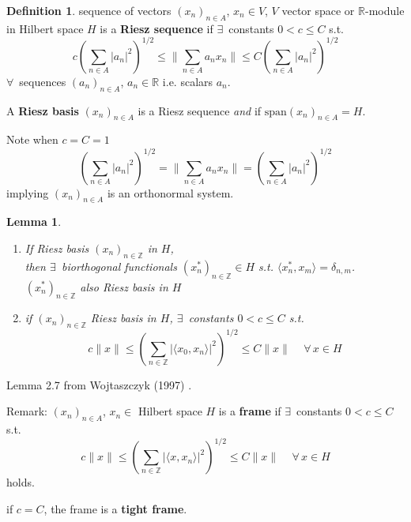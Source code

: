 \documentclass[twoside]{amsart}
\theoremstyle{plain}
\newtheorem{lemma}{Lemma}
\theoremstyle{definition}
\newtheorem{definition}{Definition}
\theoremstyle{remark}
\numberwithin{equation}{section}
\begin{document}
\begin{definition}
  sequence of vectors $(x_n)_{n\in A}$, $x_n \in V$, $V$ vector space or $\mathbb{R}$-module in Hilbert space $H$ is a \textbf{Riesz sequence} if $\exists \, $ constants $0<c\leq C$ s.t.
\begin{equation}
  c \left( \sum_{n \in A} |a_n|^2 \right)^{1/2} \leq \| \sum_{n\in A} a_n x_n \| \leq C \left( \sum_{n\in A} |a_n|^2 \right)^{1/2}
\end{equation}
$\forall \, $ sequences $(a_n)_{n\in A}$, $a_n \in \mathbb{R}$ i.e. scalars $a_n$. 
\end{definition}
A \textbf{Riesz basis } $(x_n)_{n\in A}$ is a Riesz sequence \emph{and } if $\text{span}(x_n)_{n\in A} = H$.  

Note when $c=C = 1$
\[
 \left( \sum_{n \in A} |a_n|^2 \right)^{1/2} = \| \sum_{n\in A} a_n x_n \| = \left( \sum_{n\in A} |a_n|^2 \right)^{1/2}
\]
implying $(x_n)_{n\in A}$ is an orthonormal system.  

\begin{lemma}
\begin{enumerate}
\item[(a)]
If Riesz basis $(x_n)_{n\in \mathbb{Z}}$ in $H$, \\
\phantom{If } then $\exists \, $ biorthogonal functionals $(x^*_n)_{n\in \mathbb{Z}} \in H$ s.t. $\langle x^*_n, x_m \rangle = \delta_{n,m}$. \\
$(x_n^*)_{n\in \mathbb{Z}}$ also Riesz basis in $H$
\item[(b)] if $(x_n)_{n\in \mathbb{Z}}$ Riesz basis in $H$, $\exists \, $ constants $0< c\leq C$ s.t.
\begin{equation}
  c \| x \| \leq \left( \sum_{n \in \mathbb{Z}} | \langle x_0 , x_n \rangle |^2 \right)^{1/2} \leq C \| x \| \quad \, \forall \, x \in H
\end{equation}
\end{enumerate}
\end{lemma}
Lemma 2.7 from Wojtaszczyk (1997) \cite{PWojtaszczyk1997}.  

Remark: $(x_n)_{n\in A}$, $x_n \in $ Hilbert space $H$ is a \textbf{frame} if $\exists \, $ constants $0< c\leq C$ s.t.
\begin{equation}
  c\| x\| \leq \left( \sum_{n\in \mathbb{Z}} | \langle x, x_n \rangle|^2 \right)^{1/2} \leq C \| x \| \quad \, \forall \, x \in H
\end{equation}
holds.  

if $c=C$, the frame is a \textbf{tight frame}.
\end{document}
